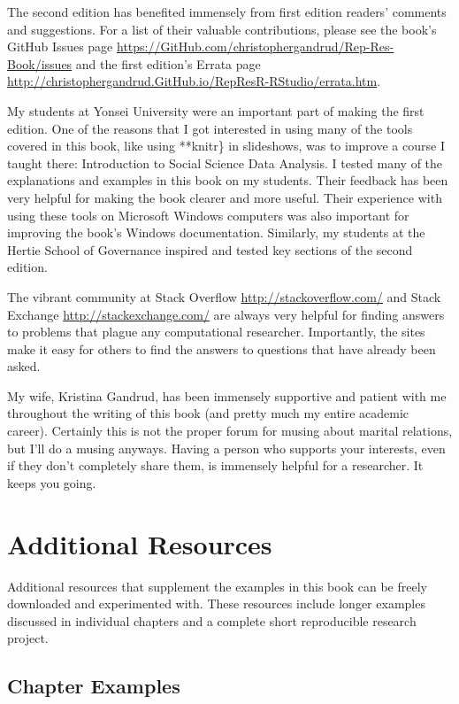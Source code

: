 \documentclass[]{krantz}
\theoremstyle{definition}
\theoremstyle{definition}
\theoremstyle{definition}
\theoremstyle{remark}
\begin{document}
The second edition has benefited immensely from first edition readers'
comments and suggestions. For a list of their valuable contributions,
please see the book's GitHub Issues page
\url{https://GitHub.com/christophergandrud/Rep-Res-Book/issues} and the
first edition's Errata page
\url{http://christophergandrud.GitHub.io/RepResR-RStudio/errata.htm}.

My students at Yonsei University were an important part of making the
first edition. One of the reasons that I got interested in using many of
the tools covered in this book, like using **knitr\} in slideshows, was
to improve a course I taught there: Introduction to Social Science Data
Analysis. I tested many of the explanations and examples in this book on
my students. Their feedback has been very helpful for making the book
clearer and more useful. Their experience with using these tools on
Microsoft Windows computers was also important for improving the book's
Windows documentation. Similarly, my students at the Hertie School of
Governance inspired and tested key sections of the second edition.

The vibrant community at Stack Overflow \url{http://stackoverflow.com/}
and Stack Exchange \url{http://stackexchange.com/} are always very
helpful for finding answers to problems that plague any computational
researcher. Importantly, the sites make it easy for others to find the
answers to questions that have already been asked.

My wife, Kristina Gandrud, has been immensely supportive and patient
with me throughout the writing of this book (and pretty much my entire
academic career). Certainly this is not the proper forum for musing
about marital relations, but I'll do a musing anyways. Having a person
who supports your interests, even if they don't completely share them,
is immensely helpful for a researcher. It keeps you going.

\hypertarget{additional-resources}{%
\chapter*{Additional Resources}\label{additional-resources}}


Additional resources that supplement the examples in this book can be
freely downloaded and experimented with. These resources include longer
examples discussed in individual chapters and a complete short
reproducible research project.

\hypertarget{chapter-examples}{%
\section*{Chapter Examples}\label{chapter-examples}}
\end{document}
